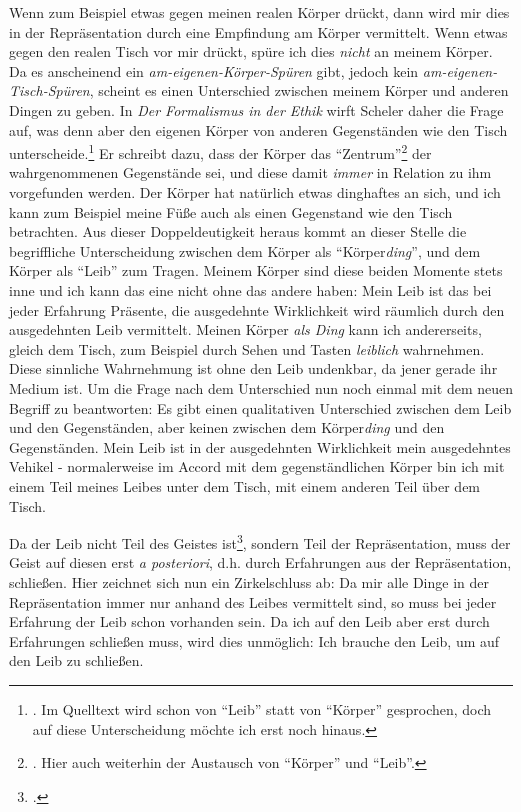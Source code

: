 \documentclass[a4paper, 12pt]{article}
\begin{document}
\begin{onehalfspace}
Wenn zum Beispiel etwas gegen meinen realen Körper drückt, dann wird mir dies in der Repräsentation durch eine Empfindung am Körper vermittelt. Wenn etwas gegen den realen Tisch vor mir drückt, spüre ich dies \emph{nicht} an meinem Körper. Da es anscheinend ein \emph{am-eigenen-Körper-Spüren} gibt, jedoch kein \emph{am-eigenen-Tisch-Spüren}, scheint es einen Unterschied zwischen meinem Körper und anderen Dingen zu geben. In \emph{Der Formalismus in der Ethik} wirft Scheler daher die Frage auf, was denn aber den eigenen Körper von anderen Gegenständen wie den Tisch unterscheide.\footnote{\Cite[Vgl.][S. 498]{scheler-ethik}. Im Quelltext wird schon von "`Leib"' statt von "`Körper"' gesprochen, doch auf diese Unterscheidung möchte ich erst noch hinaus.} Er schreibt dazu, dass der Körper das "`Zentrum"'\footnote{\Cite[Vgl.][S. 498]{scheler-ethik}. Hier auch weiterhin der Austausch von "`Körper"' und "`Leib"'.} der wahrgenommenen Gegenstände sei, und diese damit \emph{immer} in Relation zu ihm vorgefunden werden. Der Körper hat natürlich etwas dinghaftes an sich, und ich kann zum Beispiel meine Füße auch als einen Gegenstand wie den Tisch betrachten. Aus dieser Doppeldeutigkeit heraus kommt an dieser Stelle die begriffliche Unterscheidung zwischen dem Körper als "`Körper\emph{ding}"', und dem Körper als "`Leib"' zum Tragen. Meinem Körper sind diese beiden Momente stets inne und ich kann das eine nicht ohne das andere haben: Mein Leib ist das bei jeder Erfahrung Präsente, die ausgedehnte Wirklichkeit wird räumlich durch den ausgedehnten Leib vermittelt. Meinen Körper \emph{als Ding} kann ich andererseits, gleich dem Tisch, zum Beispiel durch Sehen und Tasten \emph{leiblich} wahrnehmen. Diese sinnliche Wahrnehmung ist ohne den Leib undenkbar, da jener gerade ihr Medium ist. Um die Frage nach dem Unterschied nun noch einmal mit dem neuen Begriff zu beantworten: Es gibt einen qualitativen Unterschied zwischen dem Leib und den Gegenständen, aber keinen zwischen dem Körper\emph{ding} und den Gegenständen. Mein Leib ist in der ausgedehnten Wirklichkeit mein ausgedehntes Vehikel - normalerweise im Accord mit dem gegenständlichen Körper bin ich mit einem Teil meines Leibes unter dem Tisch, mit einem anderen Teil über dem Tisch. 


Da der Leib nicht Teil des Geistes ist\footnote{\Cite[Vgl.][S. 499]{scheler-ethik}.}, sondern Teil der Repräsentation, muss der Geist auf diesen erst \emph{a posteriori}, d.h. durch Erfahrungen aus der Repräsentation, schließen. Hier zeichnet sich nun ein Zirkelschluss ab: Da mir alle Dinge in der Repräsentation immer nur anhand des Leibes vermittelt sind, so muss bei jeder Erfahrung der Leib schon vorhanden sein. Da ich auf den Leib aber erst durch Erfahrungen schließen muss, wird dies unmöglich: Ich brauche den Leib, um auf den Leib zu schließen.


\end{onehalfspace}
\end{document}
